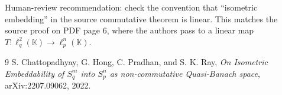 \documentclass[11pt]{article}
\begin{document}
Human-review recommendation: check the convention that ``isometric embedding'' in the source commutative theorem is linear. This matches the source proof on PDF page 6, where the authors pass to a linear map \(T:\ell_q^2(\mathbb K)\to\ell_p^n(\mathbb K)\).

\begin{thebibliography}{9}
S. Chattopadhyay, G. Hong, C. Pradhan, and S. K. Ray,
\emph{On Isometric Embeddability of \(S_q^m\) into \(S_p^n\) as non-commutative Quasi-Banach space},
arXiv:2207.09062, 2022.
\end{thebibliography}
\end{document}
